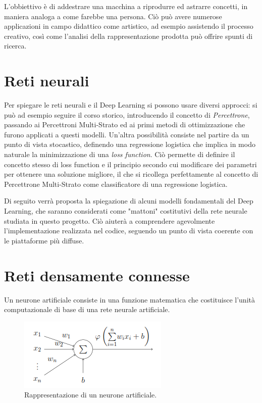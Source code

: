 L'obbiettivo è di addestrare una macchina a riprodurre ed astrarre concetti, in maniera analoga a come farebbe una persona. Ciò può avere numerose applicazioni in campo didattico come artistico, ad esempio assistendo il processo creativo, così come l'analisi della rappresentazione prodotta può offrire spunti di ricerca.
\section{Reti neurali}
Per spiegare le reti neurali e il Deep Learning si possono usare diversi approcci: si può ad esempio seguire il corso storico, introducendo il concetto di \textit{Percettrone}, passando ai Percettroni Multi-Strato ed ai primi metodi di ottimizzazione che furono applicati a questi modelli. Un'altra possibilità consiste nel partire da un punto di vista stocastico, definendo una regressione logistica che implica in modo naturale la minimizzazione di una \textit{loss function}. Ciò permette di definire il concetto stesso di loss function e il principio secondo cui modificare dei parametri per ottenere una soluzione migliore, il che si ricollega perfettamente al concetto di Percettrone Multi-Strato come classificatore di una regressione logistica.

Di seguito verrà proposta la spiegazione di alcuni modelli fondamentali del Deep Learning, che saranno considerati come "mattoni" costitutivi della rete neurale studiata in questo progetto. Ciò aiuterà a comprendere agevolmente l'implementazione realizzata nel codice, seguendo un punto di vista coerente con le piattaforme più diffuse.
\section{Reti densamente connesse} %
\label{sec:reti_densamente_connesse}
Un neurone artificiale consiste in una funzione matematica che costituisce l'unità computazionale di base di una rete neurale artificiale.
\begin{figure}[ht]
	\centering
	\includegraphics{img/artificial_neuron.PNG}
	\caption{Rappresentazione di un neurone artificiale.}
	\label{fig:1.2}
\end{figure}

